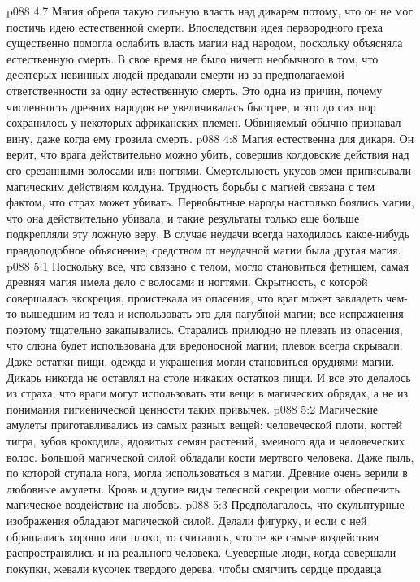 \vs p088 4:7 Магия обрела такую сильную власть над дикарем потому, что он не мог постичь идею естественной смерти. Впоследствии идея первородного греха существенно помогла ослабить власть магии над народом, поскольку объясняла естественную смерть. В свое время не было ничего необычного в том, что десятерых невинных людей предавали смерти из\hyp{}за предполагаемой ответственности за одну естественную смерть. Это одна из причин, почему численность древних народов не увеличивалась быстрее, и это до сих пор сохранилось у некоторых африканских племен. Обвиняемый обычно признавал вину, даже когда ему грозила смерть.
\vs p088 4:8 Магия естественна для дикаря. Он верит, что врага действительно можно убить, совершив колдовские действия над его срезанными волосами или ногтями. Смертельность укусов змеи приписывали магическим действиям колдуна. Трудность борьбы с магией связана с тем фактом, что страх может убивать. Первобытные народы настолько боялись магии, что она действительно убивала, и такие результаты только еще больше подкрепляли эту ложную веру. В случае неудачи всегда находилось какое\hyp{}нибудь правдоподобное объяснение; средством от неудачной магии была другая магия.
\vs p088 5:1 Поскольку все, что связано с телом, могло становиться фетишем, самая древняя магия имела дело с волосами и ногтями. Скрытность, с которой совершалась экскреция, проистекала из опасения, что враг может завладеть чем\hyp{}то вышедшим из тела и использовать это для пагубной магии; все испражнения поэтому тщательно закапывались. Старались прилюдно не плевать из опасения, что слюна будет использована для вредоносной магии; плевок всегда скрывали. Даже остатки пищи, одежда и украшения могли становиться орудиями магии. Дикарь никогда не оставлял на столе никаких остатков пищи. И все это делалось из страха, что враги могут использовать эти вещи в магических обрядах, а не из понимания гигиенической ценности таких привычек.
\vs p088 5:2 Магические амулеты приготавливались из самых разных вещей: человеческой плоти, когтей тигра, зубов крокодила, ядовитых семян растений, змеиного яда и человеческих волос. Большой магической силой обладали кости мертвого человека. Даже пыль, по которой ступала нога, могла использоваться в магии. Древние очень верили в любовные амулеты. Кровь и другие виды телесной секреции могли обеспечить магическое воздействие на любовь.
\vs p088 5:3 Предполагалось, что скульптурные изображения обладают магической силой. Делали фигурку, и если с ней обращались хорошо или плохо, то считалось, что те же самые воздействия распространялись и на реального человека. Суеверные люди, когда совершали покупки, жевали кусочек твердого дерева, чтобы смягчить сердце продавца.
